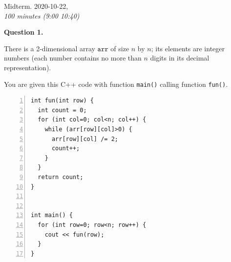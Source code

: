 \documentclass[a4paper,12pt]{article}
\begin{document}
\thispagestyle{empty}

\twocolumn

\begin{center}
{\Large Midterm. 2020-10-22},\\
{\em 100 minutes (9:00 \textendash{} 10:40)} 
\end{center}





\vspace{10pt}
{\bf Question 1.} 

There is a 2-dimensional array $\mathtt{arr}$ 
of size $n$ by $n$; its elements are
integer numbers (each number contains no more than $n$ digits in 
its decimal representation). 

You are given this C++ code with function {\tt main()} calling function {\tt fun()}.


{\footnotesize
\begin{center}
\begin{minipage}{.85\columnwidth}
\begin{Verbatim}[frame=single,numbers=left]
int fun(int row) {
  int count = 0;
  for (int col=0; col<n; col++) {
    while (arr[row][col]>0) {
      arr[row][col] /= 2;
      count++;
    }
  }
  return count;
}


int main() {
  for (int row=0; row<n; row++) {
    cout << fun(row);
  }
}
\end{Verbatim}
\end{minipage}
\end{center}
}
\end{document}
